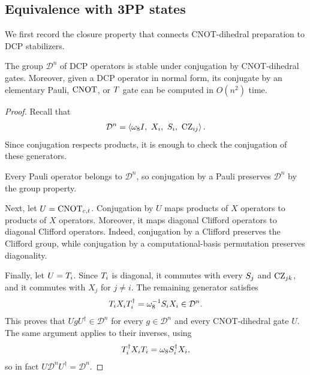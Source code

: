 \subsection{Equivalence with 3PP states}

We first record the closure property that connects CNOT-dihedral preparation to DCP stabilizers.

\begin{proposition}\label{prop:dcp-closed}
    The group $\mathcal{D}^n$ of DCP operators is stable under conjugation by CNOT-dihedral gates. Moreover, given a DCP operator in normal form, its conjugate by an elementary Pauli, $\CNOT$, or $\T$ gate can be computed in $O(n^2)$ time.
\end{proposition}
\begin{proof}
Recall that
\begin{align}
    \mathcal{D}^n=\left\langle
        \omega_8 I,\ X_i,\ \S_i,\ \CZ_{ij}
    \right\rangle.
\end{align}
Since conjugation respects products, it is enough to check the conjugation of these generators.

Every Pauli operator belongs to $\mathcal{D}^n$, so conjugation by
a Pauli preserves $\mathcal{D}^n$ by the group property.

Next, let $U=\CNOT_{c,t}$. Conjugation by $U$ maps products of $X$ operators to products of $X$ operators. Moreover, it maps diagonal Clifford operators to diagonal Clifford operators.
Indeed, conjugation by a Clifford preserves the Clifford group, while conjugation by a computational-basis permutation preserves diagonality.

Finally, let $U=\T_i$. Since $\T_i$ is diagonal, it commutes with every $\S_j$ and $\CZ_{jk}$, and it commutes with $X_j$ for $j\neq i$. The remaining generator satisfies
\begin{align}
    \T_iX_i\T_i^\dagger=\omega_8^{-1}\S_iX_i\in \mathcal{D}^n.
\end{align}
This proves that $UgU^\dagger\in \mathcal{D}^n$ for every $g\in \mathcal{D}^n$
and every CNOT-dihedral gate $U$. The same argument applies to their inverses, using
\begin{align}
    \T_i^\dagger X_i\T_i=\omega_8 \S_i^\dagger X_i,
\end{align}
so in fact $U\mathcal{D}^nU^\dagger=\mathcal{D}^n$.


\end{proof}

